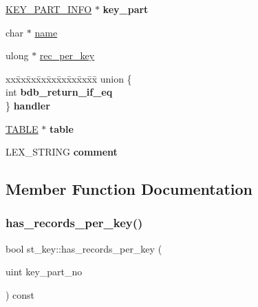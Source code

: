\begin{DoxyCompactItemize}
\begin{tabbing}
\end{tabbing}\item 
\mbox{\label{structst__key_a5f3157f7ddd3ce51b5bbfe2cdac00aa1}} 
\mbox{\hyperlink{classKEY__PART__INFO}{K\+E\+Y\+\_\+\+P\+A\+R\+T\+\_\+\+I\+N\+FO}} $\ast$ {\bfseries key\+\_\+part}
\item 
char $\ast$ \mbox{\hyperlink{structst__key_a09208aa087528b4658256b6d1056a5ce}{name}}
\item 
ulong $\ast$ \mbox{\hyperlink{structst__key_a4b511c5f76c528b7b1f020c9b6caa101}{rec\+\_\+per\+\_\+key}}
\item 
\mbox{\label{structst__key_a2cc66fa079eadcfc1dc6ad7927e101c0}} 
\begin{tabbing}
xx\=xx\=xx\=xx\=xx\=xx\=xx\=xx\=xx\=\kill
union \{\\
\>int {\bfseries bdb\_return\_if\_eq}\\
\} {\bfseries handler}\\

\end{tabbing}\item 
\mbox{\label{structst__key_a7eae957b043bf979df108f68eba21e10}} 
\mbox{\hyperlink{structTABLE}{T\+A\+B\+LE}} $\ast$ {\bfseries table}
\item 
\mbox{\label{structst__key_ae3ce14677a171d91d3f78cdadd221d47}} 
L\+E\+X\+\_\+\+S\+T\+R\+I\+NG {\bfseries comment}
\end{DoxyCompactItemize}


\subsection{Member Function Documentation}
\mbox{\label{structst__key_afaabcd2590cce5bf8db525d11a093fca}} 
\subsubsection{\texorpdfstring{has\+\_\+records\+\_\+per\+\_\+key()}{has\_records\_per\_key()}}
{\footnotesize\ttfamily bool st\+\_\+key\+::has\+\_\+records\+\_\+per\+\_\+key (\begin{DoxyParamCaption}\item[{uint}]{key\+\_\+part\+\_\+no }\end{DoxyParamCaption}) const\hspace{0.3cm}{\ttfamily [inline]}}

